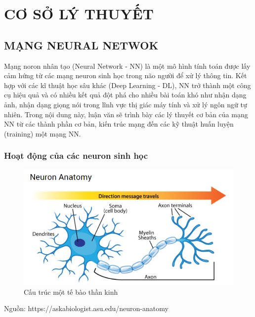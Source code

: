 \chapter{CƠ SỞ LÝ THUYẾT}
\label{c:co_so_ly_thuyet}


\section{MẠNG NEURAL NETWOK}

				
				

Mạng noron nhân tạo (Neural Network - NN) là một mô hình tính toán được lấy cảm hứng từ các mạng neuron sinh học trong não người để xử lý thông tin. Kết hợp với các kĩ thuật học sâu khác (Deep Learning - DL), NN  trở thành một công cụ hiệu quả và có nhiều kết quả đột phá cho nhiều bài toán khó như nhận dạng ảnh, nhận dạng giọng nói trong lĩnh vực thị giác máy tính và xử lý ngôn ngữ tự nhiên. Trong nội dung này, luận văn sẽ trình bày các lý thuyết cơ bản của mạng NN từ các thành phần cơ bản, kiến trúc mạng đến các kỹ thuật huấn luyện (training) một mạng NN.

\subsection{Hoạt động của các neuron sinh học}

\FloatBarrier
\begin{figure}[htp]
\begin{center}
\includegraphics[scale=0.8]{chap2/c2_figs/neuron.png}
\end{center}
\caption{Cấu trúc một tế bào thần kinh}
\label{fig:neuronsinhhoc}
\end{figure}
\FloatBarrier
\centerline{Nguồn: https://askabiologist.asu.edu/neuron-anatomy}

